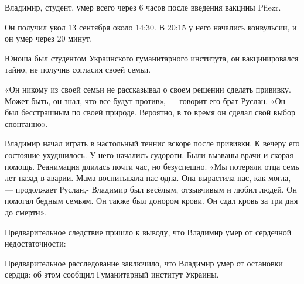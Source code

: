 Владимир, студент, умер всего через 6 часов после введения вакцины Pfiezr.

Он получил укол 13 сентября около 14:30. В 20:15 у него начались конвульсии, и
он умер через 20 минут.

Юноша был студентом Украинского гуманитарного института, он вакцинировался
тайно, не получив согласия своей семьи.

«Он никому из своей семьи не рассказывал о своем решении сделать прививку. Может
быть, он знал, что все будут против», — говорит его брат Руслан. «Он был
бесстрашным по своей природе. Вероятно, в то время он сделал свой выбор
спонтанно».

Владимир начал играть в настольный теннис вскоре после прививки. К вечеру его
состояние ухудшилось. У него начались судороги. Были вызваны врачи и скорая
помощь. Реанимация длилась почти час, но безуспешно. «Мы потеряли отца семь лет
назад в аварии. Мама воспитывала нас одна. Она вырастила нас, как могла, —
продолжает Руслан,- Владимир был весёлым, отзывчивым и любил людей. Он помогал
бедным семьям. Он также был донором крови. Он сдал кровь за три дня до смерти».

Предварительное следствие пришло к выводу, что Владимир умер от сердечной
недостаточности:

Предварительное расследование заключило, что Владимир умер от остановки сердца:
об этом сообщил Гуманитарный институт Украины.
